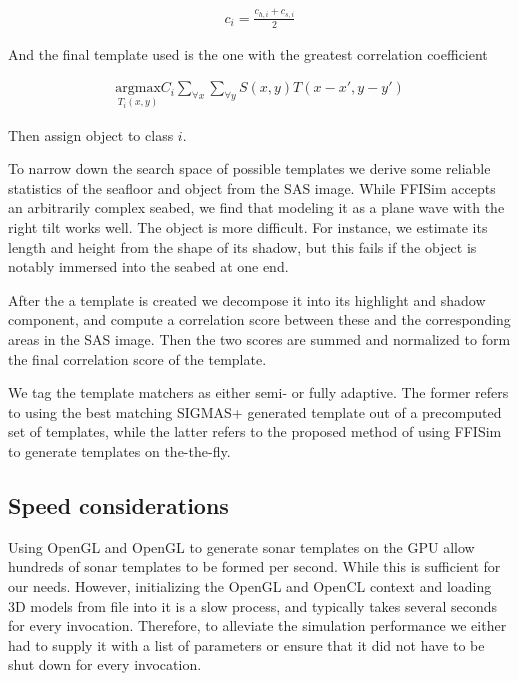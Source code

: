 \begin{align}
c_i = \frac{c_{h,i} + c_{s,i}}{2}
\end{align}

And the final template used is the one with the greatest correlation coefficient

\begin{align}
\underset{T_i(x,y)}{\text{argmax}} C_i\sum\limits_{\forall x}\sum\limits_{\forall y}  S(x,y) T(x-x',y-y')
\end{align}

Then assign object to class $i$.


To narrow down the search space of possible templates we derive some reliable statistics of the seafloor and object from the SAS image. While FFISim accepts an arbitrarily complex seabed, we find that modeling it as a plane wave with the right tilt works well. The object is more difficult. For instance, we estimate its length and height from the shape of its shadow, but this fails if the object is notably immersed into the seabed at one end. 

After the a template is created we decompose it into its highlight and shadow component, and compute a correlation score between these and the corresponding areas in the SAS image. Then the two scores are summed and normalized to form the final correlation score of the template.

We tag the template matchers as either semi- or fully adaptive. The former refers to using the best matching SIGMAS+ generated template out of a precomputed set of templates, while the latter refers to the proposed method of using FFISim to generate templates on the-the-fly.  


\subsection{Speed considerations}

Using OpenGL and OpenGL to generate sonar templates on the GPU allow hundreds of sonar templates to be formed per second. While this is sufficient for our needs. However, initializing the OpenGL and OpenCL context and loading 3D models from file into it is a slow process, and typically takes several seconds for every invocation. Therefore, to alleviate the simulation performance we either had to supply it with a list of parameters or ensure that it did not have to be shut down for every invocation. 

